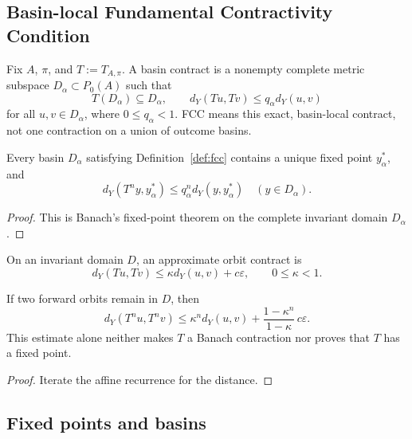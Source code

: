 \documentclass[11pt]{article}
\theoremstyle{plain}
\theoremstyle{plain}
\begin{document}
\subsection{Basin-local Fundamental Contractivity Condition}

\begin{definition}\label{def:fcc}
Fix $A$, $\pi$, and $T:=T_{A,\pi}$.  A basin contract is a nonempty complete
metric subspace $D_\alpha\subset P_0(A)$ such that
\[
T(D_\alpha)\subseteq D_\alpha,
\qquad
d_Y(Tu,Tv)\le q_\alpha d_Y(u,v)
\]
for all $u,v\in D_\alpha$, where $0\le q_\alpha<1$.  FCC means this exact,
basin-local contract, not one contraction on a union of outcome basins.
\end{definition}

\begin{theorem}\label{thm:basin-fixed-point}
Every basin $D_\alpha$ satisfying Definition~\ref{def:fcc} contains a unique
fixed point $y_\alpha^\ast$, and
\[
d_Y(T^ny,y_\alpha^\ast)\le
q_\alpha^n d_Y(y,y_\alpha^\ast)
\quad(y\in D_\alpha).
\]
\end{theorem}

\begin{proof}
This is Banach's fixed-point theorem on the complete invariant domain
$D_\alpha$.
\end{proof}

\begin{definition}
On an invariant domain $D$, an approximate orbit contract is
\[
d_Y(Tu,Tv)\le\kappa d_Y(u,v)+c\varepsilon,
\qquad 0\le\kappa<1.
\]
\end{definition}

\begin{proposition}\label{prop:approximate}
If two forward orbits remain in $D$, then
\[
d_Y(T^nu,T^nv)
\le \kappa^n d_Y(u,v)
+ \frac{1-\kappa^n}{1-\kappa}\,c\varepsilon.
\]
This estimate alone neither makes $T$ a Banach contraction nor proves that
$T$ has a fixed point.
\end{proposition}

\begin{proof}
Iterate the affine recurrence for the distance.
\end{proof}

\subsection{Fixed points and basins}
\end{document}
